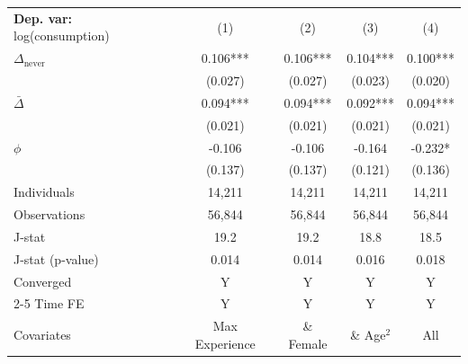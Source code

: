 \begin{tabular}{l cccc} \toprule  \textbf{Dep. var:}  log(consumption) 
                    &\multicolumn{1}{c}{(1)}   &\multicolumn{1}{c}{(2)}   &\multicolumn{1}{c}{(3)}   &\multicolumn{1}{c}{(4)}   \\

\addlinespace
$\Delta_{\text{never}}$&       0.106***&       0.106***&       0.104***&       0.100***\\
                    &     (0.027)   &     (0.027)   &     (0.023)   &     (0.020)   \\

\addlinespace
$\bar{\Delta}$      &       0.094***&       0.094***&       0.092***&       0.094***\\
                    &     (0.021)   &     (0.021)   &     (0.021)   &     (0.021)   \\

\addlinespace
$\phi$              &      -0.106   &      -0.106   &      -0.164   &      -0.232*  \\
                    &     (0.137)   &     (0.137)   &     (0.121)   &     (0.136)   \\
\addlinespace
Individuals         &      14,211   &      14,211   &      14,211   &      14,211   \\
Observations        &      56,844   &      56,844   &      56,844   &      56,844   \\
J-stat              &        19.2   &        19.2   &        18.8   &        18.5   \\
J-stat (p-value)    &       0.014   &       0.014   &       0.016   &       0.018   \\
Converged           &           Y   &           Y   &           Y   &           Y   \\
\cmidrule{2-5} Time FE & Y & Y & Y & Y \\ Covariates & Max Experience & \& Female & \& Age$^2$ & All \\ \bottomrule \end{tabular}

